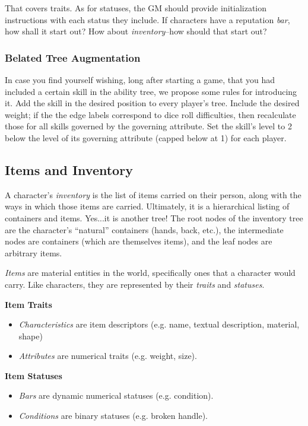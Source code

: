 \documentclass[12pt]{article}
\begin{document}
That covers traits. As for statuses,
the GM should provide initialization instructions with each status they include.
If characters have a reputation \emph{bar}, how shall it start out?
How about \emph{inventory}--how should that start out?



\subsubsection{Belated Tree Augmentation}\label{sec:bta}

In case you find yourself wishing, long after starting a game,
that you had included a certain skill in the ability tree,
we propose some rules for introducing it.
Add the skill in the desired position to every player's tree.
Include the desired weight;
if the the edge labels correspond to dice roll difficulties, then recalculate those for all skills governed by the governing attribute.
Set the skill's level to 2 below the level of its governing attribute (capped below at 1) for each player.




\subsection{Items and Inventory} \label{sec:items}
A character's \emph{inventory} is the list of items carried on their person,
along with the ways in which those items are carried.
Ultimately, it is a hierarchical listing of containers and items.
Yes...it is another tree!
The root nodes of the inventory tree are the character's ``natural'' containers (hands, back, etc.),
the intermediate nodes are containers (which are themselves items),
and the leaf nodes are arbitrary items.

\emph{Items} are material entities in the world, 
specifically ones that a character would carry.
Like characters, they are represented by their \emph{traits} and \emph{statuses}.

\textbf{Item Traits}
\vspace{-1em}
\begin{itemize}
\item \emph{Characteristics} are item descriptors (e.g. name, textual description, material, shape)
\item \emph{Attributes} are numerical traits (e.g. weight, size).
\end{itemize}
\textbf{Item Statuses}
\vspace{-1em}
\begin{itemize}
\item \emph{Bars} are dynamic numerical statuses (e.g. condition).
\item \emph{Conditions} are binary statuses (e.g. broken handle).
\end{itemize}
\end{document}
